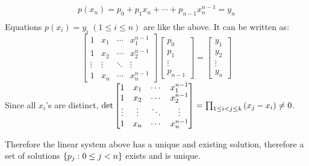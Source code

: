 \documentclass[10pt]{article}
\begin{document}
\begin{enumerate}[leftmargin=*, label={(\alph*)}]
\begin{gather*}
        p(x_n) = p_0 + p_1x_n + \cdots + p_{n-1}x_n^{n-1} = y_n \\
    \end{gather*}
    Equations $p(x_i) = y_i \; (1 \leq i \leq n)$ are like the above.
    It can be written as:
    $$\begin{bmatrix}
        1 & x_1 & \cdots & x_1^{n-1} \\
        1 & x_2 & \cdots & x_2^{n-1} \\
        \vdots & \vdots & \ddots & \vdots \\
        1 & x_{n} & \cdots & x_{n}^{n-1}
    \end{bmatrix}\begin{bmatrix}
        p_0 \\ p_1 \\ \vdots \\ p_{n-1}
    \end{bmatrix} = \begin{bmatrix}
        y_1 \\ y_2 \\ \vdots \\ y_n
    \end{bmatrix}$$
    Since all $x_i$'s are distinct, $\det\begin{bmatrix}
        1 & x_1 & \cdots & x_1^{n-1} \\
        1 & x_2 & \cdots & x_2^{n-1} \\
        \vdots & \vdots & \ddots & \vdots \\
        1 & x_{n} & \cdots & x_{n}^{n-1}
    \end{bmatrix} = \prod_{1 \leq i < j \leq k}\qty(x_j - x_i) \neq 0$.
    \vspace{2mm}

    Therefore the linear system above has a unique and existing solution, therefore a set of solutions $\qty{p_j : 0 \leq j < n}$ exists and is unique. 
\end{enumerate}
\end{document}
